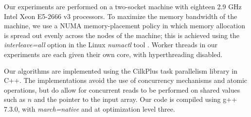 \documentclass[11pt]{article}
\newcommand{\defn}[1]{{\textit{\textbf{\boldmath #1}}} }
\renewcommand{\paragraph}[1]{\vspace{0.09in}\noindent{\bf \boldmath #1.}}
\theoremstyle{remark}
\theoremstyle{remark}
\begin{document}





\paragraph{Machine Details}
Our experiments are performed on a two-socket machine with eighteen
2.9 GHz Intel Xeon E5-2666 v3 processors. To maximize the memory
bandwidth of the machine, we use a NUMA memory-placement policy in
which memory allocation is spread out evenly across the nodes of the
machine; this is achieved using the \emph{interleave=all} option in
the Linux \emph{numactl} tool \cite{Kleen05}. Worker threads in our
experiments are each given their own core, with hyperthreading
disabled.

Our algorithms are implemented using the CilkPlus task parallelism
library in C++. The implementations avoid the use of concurrency
mechanisms and atomic operations, but do allow for concurrent reads to
be performed on shared values such as $n$ and the pointer to the input
array. Our code is compiled using g++ 7.3.0, with \emph{march=native}
and at optimization level three. 
\end{document}
